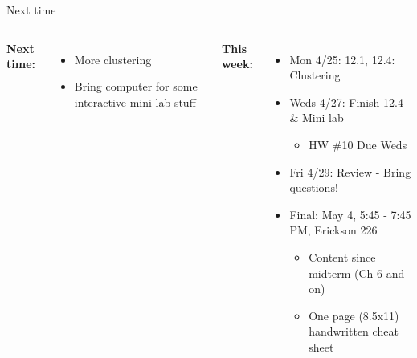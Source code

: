 \documentclass[aspectratio=169,usenames,dvipsnames]{beamer}
\begin{document}
\begin{frame}[t]{Next time}


\begin{columns}
\centering

\textbf{Next time:}

\begin{itemize}
	\item More clustering
	\item Bring computer for some interactive mini-lab stuff
\end{itemize}

\centering

\textbf{This week:}


	\begin{itemize}
	\item Mon 4/25: 12.1, 12.4: Clustering
	\item Weds 4/27: Finish 12.4 \& Mini lab
	\begin{itemize}
		\item HW \#10 Due Weds
	\end{itemize}
	\item Fri 4/29: Review - Bring questions!
	\item Final: May 4, 5:45 - 7:45 PM, Erickson 226
	\begin{itemize}
		\item Content since midterm (Ch 6 and on)
		\item One page (8.5x11) handwritten cheat sheet
	\end{itemize}
	\end{itemize}
	\end{columns}

\end{frame}
\end{document}
